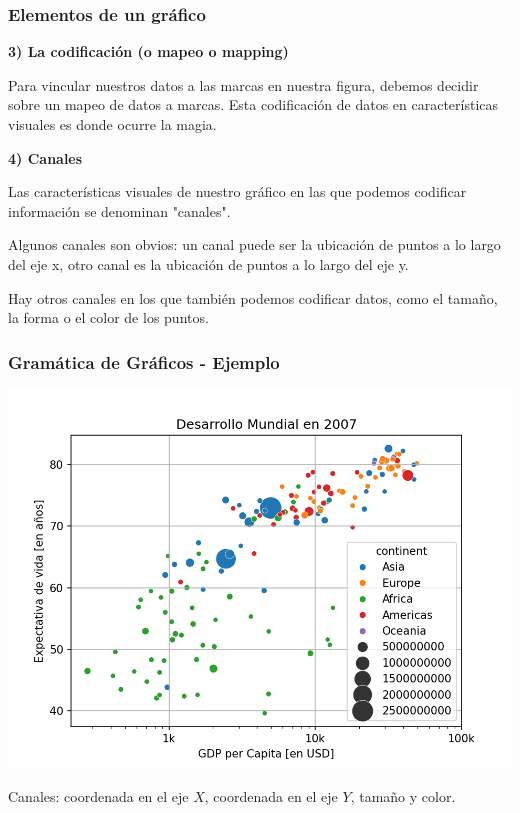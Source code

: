 \documentclass[aspectratio=169,12pt]{beamer}
\begin{document}

\begin{frame}
\frametitle{Elementos de un gráfico}

\textbf{3) La codificación (o mapeo o mapping)}

Para vincular nuestros datos a las marcas en nuestra figura, debemos decidir sobre un mapeo de datos a marcas. Esta codificación de datos en características visuales es donde ocurre la magia.

\textbf{4) Canales}

Las características visuales de nuestro gráfico en las que podemos codificar información se denominan "canales".

Algunos canales son obvios: un canal puede ser la ubicación de puntos a lo largo del eje x, otro canal es la ubicación de puntos a lo largo del eje y.

Hay otros canales en los que también podemos codificar datos, como el tamaño, la forma o el color de los puntos.

\end{frame}


\begin{frame}
\frametitle{Gramática de Gráficos - Ejemplo}

\begin{center}
\includegraphics[scale=0.5]{desarrollo2007.png}
\end{center}

Canales: coordenada en el eje $X$, coordenada en el eje $Y$, tamaño y color.
\end{frame}
\end{document}
